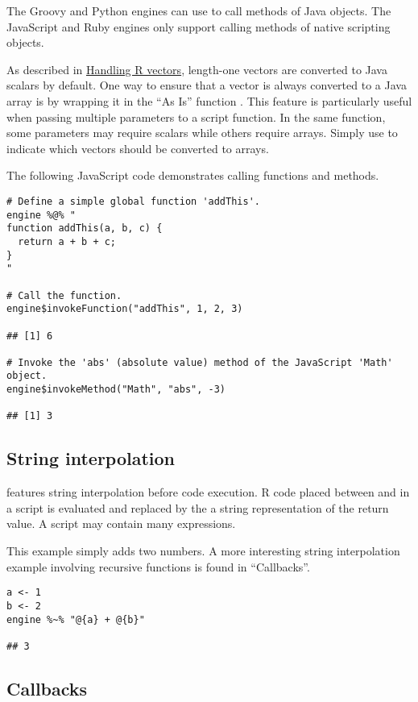  The Groovy and Python engines can use  to call methods of Java objects. The JavaScript and Ruby engines only support calling methods of native scripting objects.

As described in \hyperlink{handlingrvectors}{Handling R vectors}, length-one vectors are converted to Java scalars by default. One way to ensure that a vector is always converted to a Java array is by wrapping it in the ``As Is'' function . This feature is particularly useful when passing multiple parameters to a script function. In the same function, some parameters may require scalars while others require arrays. Simply use  to indicate which vectors should be converted to arrays.

The following JavaScript code demonstrates calling functions and methods.

\begin{verbatim}
# Define a simple global function 'addThis'.
engine %@% "
function addThis(a, b, c) {
  return a + b + c;
}
"

# Call the function.
engine$invokeFunction("addThis", 1, 2, 3)

## [1] 6

# Invoke the 'abs' (absolute value) method of the JavaScript 'Math' object.
engine$invokeMethod("Math", "abs", -3)

## [1] 3
\end{verbatim}

\subsection{String interpolation}

 features string interpolation before code execution. R code placed between  and \code{\}} in a script is evaluated and replaced by the a string representation of the return value. A script may contain many  expressions.

This example simply adds two numbers. A more interesting string interpolation example involving recursive functions is found in “Callbacks”.

\begin{verbatim}
a <- 1
b <- 2
engine %~% "@{a} + @{b}"

## 3
\end{verbatim}

\subsection{Callbacks}


